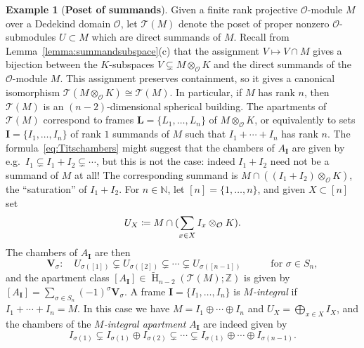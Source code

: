 \documentclass[11 pt]{article}
\theoremstyle{plain}
\theoremstyle{definition}
\newtheorem{example}[theorem]{Example}
\numberwithin{equation}{section}
\newcommand\Z{\ensuremath{\mathbb{Z}}}
\newcommand\N{\ensuremath{\mathbb{N}}}
\DeclareMathOperator{\HH}{H}
\renewcommand{\O}{\mathcal{O}}
\newcommand\Tits{\ensuremath{\mathcal{T}}}
\newcommand\LL{\mathbf{L}}
\newcommand\II{\mathbf{I}}
\newcommand\VV{\mathbf{V}}
\newcommand\coloneq{\mathrel{\mathop:}\mkern-1.2mu=}
\newcommand\tensor{\otimes}
\newcommand\iso{\cong}
\begin{document}
\begin{example}[{\bf Poset of summands}]
\label{ex:Titssummands}
Given a finite rank projective $\O$-module $M$ over a Dedekind domain $\O$, let $\Tits(M)$ denote the poset of proper nonzero $\O$-submodules $U\subset M$ which are direct summands of $M$. 
Recall from Lemma~\ref{lemma:summandsubspace}(c) that the assignment $V\mapsto V\cap M$ gives a bijection between the $K$-subspaces $V \subsetneq M\tensor_\O K$ and the direct summands of the $\O$-module $M$. This assignment preserves containment, so it gives a canonical isomorphism $\Tits(M\tensor_\O K)\iso \Tits(M)$. In particular, if $M$ has rank $n$, then $\Tits(M)$ is an $(n-2)$-dimensional spherical building.
The apartments of $\Tits(M)$ correspond to frames $\LL=\{L_1,\ldots,L_n\}$ of $M\tensor_\O K$, or equivalently to sets $\II=\{I_1,\ldots,I_n\}$ of rank $1$ summands of $M$ such that $I_1+\cdots+I_n$ has rank $n$.  The formula~\eqref{eq:Titschambers} might suggest that the chambers of $A_{\II}$ are given by e.g.\ $I_1\subsetneq I_1+I_2\subsetneq \cdots$, but this is  not the case: indeed $I_1+I_2$ need not be a summand of $M$ at all! The corresponding summand is  $M\cap ((I_1+I_2)\otimes_\O K)$, the ``saturation'' of $I_1+I_2$. For $n\in \N$, let $[n]= \{1,\ldots,n\}$, and given $X\subset[n]$ set \begin{equation}
\label{eq:UX}
U_X \coloneq  M\cap (\sum_{x\in X} I_x\otimes_\O K).
\end{equation}
 The chambers of $A_{\II}$ are then
\[\VV_\sigma\colon\quad U_{\sigma([1])}\subsetneq U_{\sigma([2])}\subsetneq \cdots\subsetneq U_{\sigma([n-1])}\qquad\quad\text{for } \sigma\in S_n,\]
and the apartment class
$[A_{\II}]\in \widetilde{\HH}_{n-2}(\Tits(M);\Z)$ is given by $[A_{\II}]=\sum_{\sigma\in S_n}(-1)^\sigma \VV_\sigma$.
A frame $\II=\{I_1,\ldots,I_n\}$ is \emph{$M$-integral} if $I_1+\cdots+I_n=M$. In this case we have $M=I_1\oplus \cdots\oplus I_n$ and $U_X=\bigoplus_{x\in X}I_X$, and the chambers of the \emph{$M$-integral apartment} $A_{\II}$ are indeed given by 
\[I_{\sigma(1)} \subsetneq  I_{\sigma(1)} \oplus I_{\sigma(2)} \subsetneq
\cdots \subsetneq I_{\sigma(1)}\oplus\cdots\oplus I_{\sigma(n-1)}.
\]
\end{example}
\end{document}
